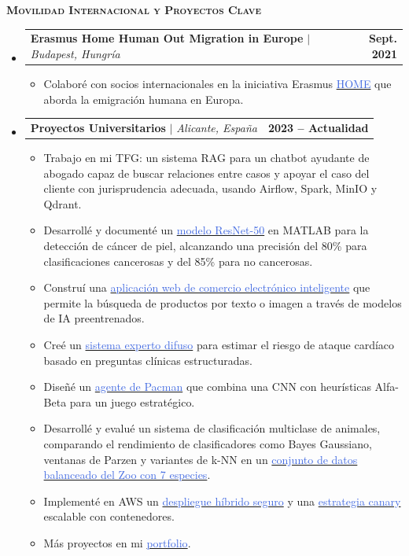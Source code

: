 \documentclass[letterpaper,11pt]{article}
\makeatletter
\newcommand{\resumeItem}[1]{
  \item\small{
    {#1 \vspace{-2pt}}
  }
}
\newcommand{\resumeProjectHeading}[2]{
    \item
    \begin{tabular*}{1.001\textwidth}{l@{\extracolsep{\fill}}r}
      \small#1 & \textbf{\small #2}\\
    \end{tabular*}\vspace{-7pt}
}
\newcommand{\bluehref}[2]{\href{#1}{\textcolor{RoyalBlue}{#2}}}
\newcommand{\resumeSubHeadingListStart}{\begin{itemize}[leftmargin=0.0in, label={}]}
\newcommand{\resumeSubHeadingListEnd}{\end{itemize}}
\newcommand{\resumeItemListStart}{\begin{itemize}}
\newcommand{\resumeItemListEnd}{\end{itemize}\vspace{-3pt}}
\newenvironment{resumeSection}[1]{
  \begin{tcolorbox}[
    colback=white,
    boxrule=0pt,
    sharp corners,
    enhanced,
    breakable,
    left=4pt,
    right=4pt,
    top=4pt,
    bottom=4pt,
    borderline west={0.6pt}{0pt}{black},
    borderline east={0.6pt}{0pt}{black},
    borderline north={0.6pt}{0pt}{black},
    borderline south={0.6pt}{0pt}{black}
  ]
  {\scshape\large\bfseries #1}\par\vspace{1pt}
}{
  \end{tcolorbox}
  \vspace{-2pt}
}
\makeatother
\begin{document}
\begin{resumeSection}{Movilidad Internacional y Proyectos Clave}
  \resumeSubHeadingListStart
    \resumeProjectHeading
      {\textbf{Erasmus Home Human Out Migration in Europe} $|$ \emph{Budapest, Hungría}}{Sept. 2021}
      \resumeItemListStart
        \resumeItem{Colaboré con socios internacionales en la iniciativa Erasmus \bluehref{https://erasmus-plus.ec.europa.eu/projects/search/details/2020-1-FR01-KA229-079855}{HOME} que aborda la emigración humana en Europa.}
      \resumeItemListEnd
    \resumeProjectHeading
      {\textbf{Proyectos Universitarios} $|$ \emph{Alicante, España}}{2023 -- Actualidad}
      \resumeItemListStart
  \resumeItem{Trabajo en mi TFG: un sistema RAG para un chatbot ayudante de abogado capaz de buscar relaciones entre casos y apoyar el caso del cliente con jurisprudencia adecuada, usando Airflow, Spark, MinIO y Qdrant.}\resumeItem{Desarrollé y documenté un \bluehref{https://github.com/JBLOZ/CNN-classification----geometric2d-and-cancer-dangerousness}{modelo ResNet-50} en MATLAB para la detección de cáncer de piel, alcanzando una precisión del 80\% para clasificaciones cancerosas y del 85\% para no cancerosas.}\resumeItem{Construí una \bluehref{https://github.com/JBLOZ/py-ecommerce-software-proyect}{aplicación web de comercio electrónico inteligente} que permite la búsqueda de productos por texto o imagen a través de modelos de IA preentrenados.}\resumeItem{Creé un \bluehref{https://github.com/JBLOZ/heart-attack-fuzzy-system}{sistema experto difuso} para estimar el riesgo de ataque cardíaco basado en preguntas clínicas estructuradas.}\resumeItem{Diseñé un \bluehref{https://jbloz.github.io/portfolio/proyectos/PACMAN-CNN-Alphabeta/memoria.pdf}{agente de Pacman} que combina una CNN con heurísticas Alfa-Beta para un juego estratégico.}\resumeItem{Desarrollé y evalué un sistema de clasificación multiclase de animales, comparando el rendimiento de clasificadores como Bayes Gaussiano, ventanas de Parzen y variantes de k-NN en un \bluehref{https://jbloz.github.io/portfolio/proyectos/aprendizaje_automatico/p_02/memoria.pdf}{conjunto de datos balanceado del Zoo con 7 especies}.}\resumeItem{Implementé en AWS un \bluehref{https://jbloz.github.io/portfolio/proyectos/aws/p_03/memoria_03.pdf}{despliegue híbrido seguro} y una \bluehref{https://jbloz.github.io/portfolio/proyectos/aws/p_04/memoria_04.pdf}{estrategia canary} escalable con contenedores.}\resumeItem{Más proyectos en mi \bluehref{https://jbloz.github.io/portfolio}{portfolio}.}
      \resumeItemListEnd
  \resumeSubHeadingListEnd
\end{resumeSection}
\end{document}
